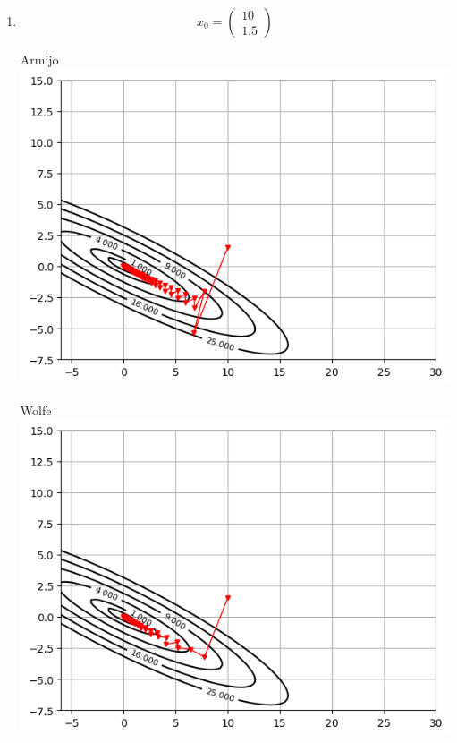 \documentclass[12pt]{article}
\begin{document}
\begin{enumerate}

\item %

$$
x_0 = 
\begin{pmatrix}
10 \\
1.5
\end{pmatrix}
$$

Armijo
\includegraphics{exp1/strategies/1_armijo.png}


Wolfe
\includegraphics{exp1/strategies/1_wolfe.png}



\end{enumerate}
\end{document}
